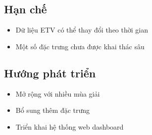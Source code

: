 \documentclass[12pt,a4paper]{article}
\begin{document}
\subsection{Hạn chế}
\begin{itemize}
\item Dữ liệu ETV có thể thay đổi theo thời gian
\item Một số đặc trưng chưa được khai thác sâu
\end{itemize}

\subsection{Hướng phát triển}
\begin{itemize}
\item Mở rộng với nhiều mùa giải
\item Bổ sung thêm đặc trưng
\item Triển khai hệ thống web dashboard
\end{itemize}
\end{document}
